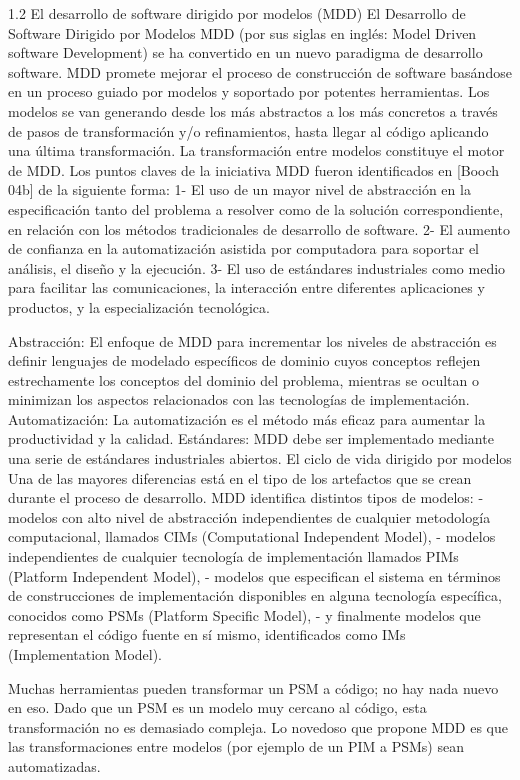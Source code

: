 \begin{enumerate}
1.2	El desarrollo de software dirigido por modelos (MDD)
El Desarrollo de Software Dirigido por Modelos MDD (por sus siglas en inglés: Model Driven software Development) se ha convertido en un nuevo paradigma de desarrollo software. MDD promete mejorar el proceso de construcción de software basándose en un proceso guiado por modelos y soportado por potentes herramientas.
Los modelos se van generando desde los más abstractos a los más concretos a través de pasos de transformación y/o refinamientos, hasta llegar al código aplicando una última transformación. La transformación entre modelos constituye el motor de MDD.
Los puntos claves de la iniciativa MDD fueron identificados en [Booch 04b] de la siguiente forma: 
1-	El uso de un mayor nivel de abstracción en la especificación tanto del problema a resolver como de la solución correspondiente, en relación con los métodos tradicionales de desarrollo de software. 
2-	El aumento de confianza en la automatización asistida por computadora para soportar el análisis, el diseño y la ejecución. 
3-	El uso de estándares industriales como medio para facilitar las comunicaciones, la interacción entre diferentes aplicaciones y productos, y la especialización tecnológica.
 
Abstracción: El enfoque de MDD para incrementar los niveles de abstracción es definir lenguajes de modelado específicos de dominio cuyos conceptos reflejen estrechamente los conceptos del dominio del problema, mientras se ocultan o minimizan los aspectos relacionados con las tecnologías de implementación.
Automatización: La automatización es el método más eficaz para aumentar la productividad y la calidad.
Estándares: MDD debe ser implementado mediante una serie de estándares industriales abiertos.
El ciclo de vida dirigido por modelos
Una de las mayores diferencias está en el tipo de los artefactos que se crean durante el proceso de desarrollo.
MDD identifica distintos tipos de modelos: - modelos con alto nivel de abstracción independientes de cualquier metodología computacional, llamados CIMs (Computational Independent Model), - modelos independientes de cualquier tecnología de implementación llamados PIMs (Platform Independent Model), - modelos que especifican el sistema en términos de construcciones de implementación disponibles en alguna tecnología específica, conocidos como PSMs (Platform Specific Model), - y finalmente modelos que representan el código fuente en sí mismo, identificados como IMs (Implementation Model).
 
Muchas herramientas pueden transformar un PSM a código; no hay nada nuevo en eso. Dado que un PSM es un modelo muy cercano al código, esta transformación no es demasiado compleja. Lo novedoso que propone MDD es que las transformaciones entre modelos (por ejemplo de un PIM a PSMs) sean automatizadas.
 

\end{enumerate}
